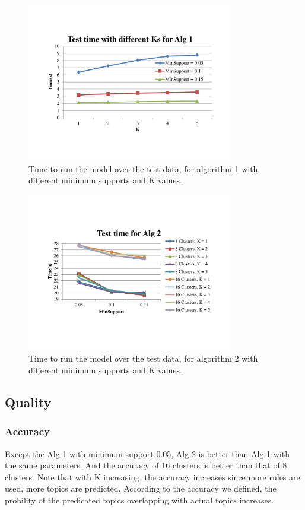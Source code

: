 \begin{figure}
\centering
\includegraphics[width=0.8\textwidth]{TestingTime1}
\caption{\footnotesize Time to run the model over the test data, for algorithm
1 with different minimum supports and K values. }
\label{Fig:TestTime1}
\end{figure}

\begin{figure}[b!]
\centering
\includegraphics[width=0.8\textwidth]{TestingTime2}
\caption{\footnotesize Time to run the model over the test data, for algorithm
2 with different minimum supports and K values. }
\label{Fig:TestTime2}
\end{figure}

\subsection{Quality}
\subsubsection{Accuracy}
Except the Alg 1 with minimum support 0.05, Alg 2 is better than Alg 1 with the
same parameters. And the accuracy of 16 clusters is better than that of 8
clusters. Note that with K increasing, the accuracy increases since more
rules are used, more topics are predicted. According to the accuracy we defined,
the probility of the predicated topics overlapping with actual topics increases.

